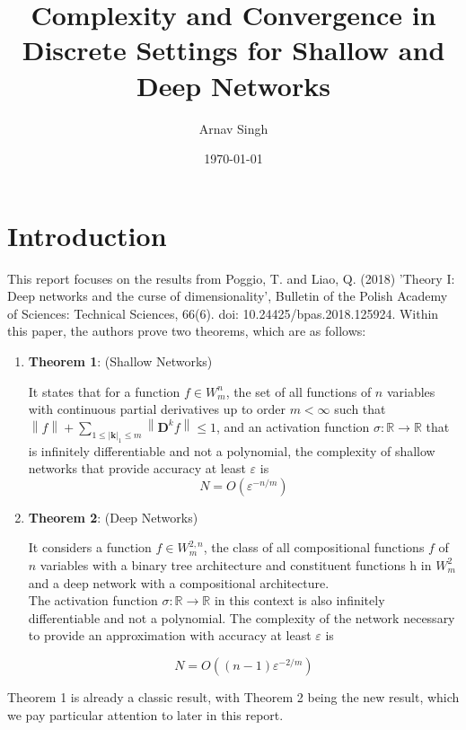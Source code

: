 \documentclass{article}
\title{Complexity and Convergence in Discrete Settings for Shallow and Deep Networks}
\author{Arnav Singh}
\date{\today}
\begin{document}
\maketitle

\pagebreak

\setcounter{section}{-1} 
\section{Introduction}

This report focuses on the results from Poggio, T. and Liao, Q. (2018) 'Theory I: Deep networks and the curse of dimensionality', Bulletin of the Polish Academy of Sciences: Technical Sciences, 66(6). doi: 10.24425/bpas.2018.125924. Within this paper, the authors prove two theorems, which are as follows:

\begin{enumerate}
    
\item \textbf{Theorem 1}: (Shallow Networks)

It states that for a function \( f \in W_{m}^{n} \), the set of all functions of \(n\) variables with continuous partial derivatives up to order \(m < \infty \) such that \(\left\lVert f\right\rVert + \sum_{1\leq \left\vert \mathbf{k}  \right\vert_{1} \leq m} \left\lVert \mathbf{D}^{k} f\right\rVert \leq 1  \), and an activation function \( \sigma: \mathbb{R} \rightarrow \mathbb{R} \) that is infinitely differentiable and not a polynomial, the complexity of shallow networks that provide accuracy at least \( \varepsilon \) is 
\[ N = O(\varepsilon^{-n/m}) \]

\item \textbf{Theorem 2}: (Deep Networks)

It considers a function \( f \in W_{m}^{2,n} \), the class of all compositional functions \(f\) of \(n\) variables with a binary tree architecture and constituent functions h in \(W_{m}^{2}\)  and a deep network with a compositional architecture.\\
The activation function \( \sigma: \mathbb{R} \rightarrow \mathbb{R} \) in this context is also infinitely differentiable and not a polynomial. The complexity of the network necessary to provide an approximation with accuracy at least \( \varepsilon \) is 

\[ N = O((n - 1)\varepsilon^{-2/m}) \]
\end{enumerate}

Theorem 1 is already a classic result, with Theorem 2 being the new result, which we pay particular attention to later in this report.
\end{document}
